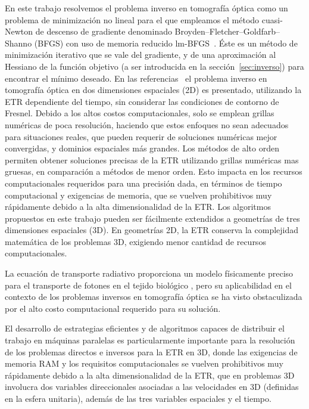  En este trabajo resolvemos el problema inverso en tomografía óptica como un problema 
 de minimización no lineal para el que empleamos
 el método cuasi-Newton de descenso de gradiente denominado 
 Broyden–Fletcher–Goldfarb–Shanno (BFGS) con uso de memoria reducido lm-BFGS~\cite{Byrd1995}. Éste es un método de minimización iterativo 
 que se vale del gradiente, y de una aproximación 
 al Hessiano de la función objetivo (a ser 
 introducida en la sección~\ref{sec:inverso}) para encontrar el mínimo deseado. En las referencias~\cite{Prieto2017,Boulanger2005} 
 el problema inverso en tomografía óptica en dos dimensiones espaciales (2D)
es presentado, utilizando la ETR dependiente del tiempo, sin considerar las condiciones de contorno de Fresnel. Debido a los altos costos computacionales,
 solo se emplean grillas numéricas de poca resolución,
 haciendo que estos enfoques no sean adecuados para situaciones reales, que pueden requerir
 de soluciones numéricas mejor convergidas, y dominios espaciales más grandes. 
 Los métodos de alto orden
 permiten obtener soluciones precisas de la ETR
 utilizando grillas numéricas mas gruesas, en comparación a métodos de menor orden. Esto impacta en los recursos computacionales requeridos para una precisión dada, en términos de tiempo computacional y exigencias de memoria, que se vuelven prohibitivos muy rápidamente debido a la alta dimensionalidad de la ETR. Los algoritmos propuestos 
 en este trabajo pueden ser fácilmente extendidos a geometrías de tres dimensiones espaciales (3D). En geometrías 2D, la ETR
 conserva la complejidad matemática de los problemas 3D, 
 exigiendo menor cantidad de recursos computacionales.

La ecuación de transporte radiativo proporciona un
modelo físicamente preciso para el transporte de fotones en el tejido biológico
\cite{Klose2009, Arridge2009}, pero su aplicabilidad en el contexto de
los problemas inversos en tomografía óptica se ha visto obstaculizada por el alto costo computacional requerido para su solución. 

El desarrollo de estrategias eficientes y de algoritmos capaces de distribuir el trabajo en máquinas paralelas es particularmente importante para la
resolución de los problemas directos e inversos para la ETR en 3D, donde las exigencias 
de memoria RAM y
los requisitos computacionales se vuelven prohibitivos muy rápidamente
debido a la alta dimensionalidad de la ETR, que en problemas 3D
involucra dos variables direccionales asociadas a las velocidades en 3D (definidas 
en la esfera unitaria), además de las tres variables espaciales y el tiempo.

